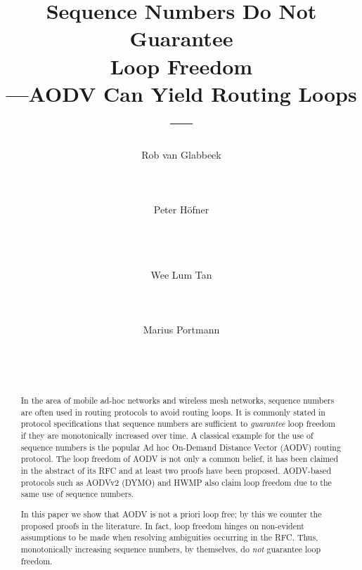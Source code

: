 \documentclass[letterpaper]{sig-alternate-pages}
\begin{document}
\title{Sequence Numbers Do Not Guarantee\\ Loop Freedom\\
---AODV Can Yield Routing Loops---}
\author{
\alignauthor Rob van Glabbeek\\
       \\[0.5mm]
       \\
       \\
\alignauthor Peter H{\"o}fner\\
       \\[0.5mm]
       \\
       \\
\and
\alignauthor Wee Lum Tan\\
       \\[0.5mm]
       \\
       \\
\alignauthor Marius Portmann\\
       \\[0.5mm]
       \\
       \\
}

\maketitle
\vspace{-24pt} \begin{abstract}
In the area of mobile ad-hoc networks and wireless mesh networks,
sequence numbers are often used in routing protocols to avoid routing
loops.  
It is commonly stated in protocol specifications that  sequence numbers are sufficient to
{\em guarantee} loop freedom if they are monotonically increased over
time.  A classical example for the use of sequence numbers is the
popular Ad hoc On-Demand Distance Vector (AODV) routing protocol.  
The loop freedom of AODV is not only 
a common belief, it has been claimed in the abstract of its RFC
and at least two proofs have been proposed.
AODV-based protocols such as AODVv2 (DYMO) and 
HWMP also claim loop freedom due to the same use of sequence numbers.

In this paper we show that AODV is not a priori loop free; 
by this we counter the proposed proofs in the literature.
In fact, loop freedom hinges on non-evident assumptions to be made when
resolving ambiguities occurring in the RFC\@.  Thus, monotonically increasing sequence
numbers, by themselves, do {\em not} guarantee loop freedom.
\end{abstract}
 \vfill
\end{document}
